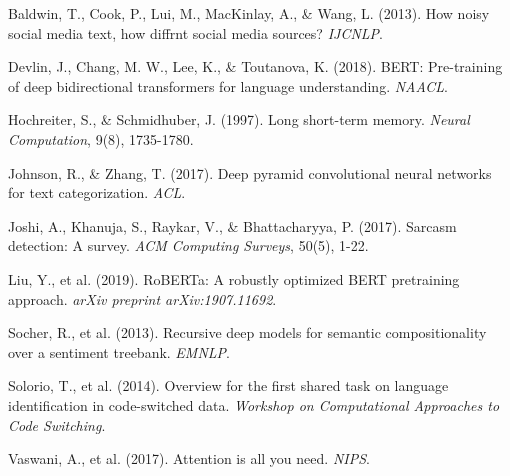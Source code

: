 \documentclass[11pt,a4paper]{article}
\begin{document}

\begin{thebibliography}{10}

Baldwin, T., Cook, P., Lui, M., MacKinlay, A., \& Wang, L. (2013). How noisy social media text, how diffrnt social media sources? \textit{IJCNLP}.

Devlin, J., Chang, M. W., Lee, K., \& Toutanova, K. (2018). BERT: Pre-training of deep bidirectional transformers for language understanding. \textit{NAACL}.

Hochreiter, S., \& Schmidhuber, J. (1997). Long short-term memory. \textit{Neural Computation}, 9(8), 1735-1780.

Johnson, R., \& Zhang, T. (2017). Deep pyramid convolutional neural networks for text categorization. \textit{ACL}.

Joshi, A., Khanuja, S., Raykar, V., \& Bhattacharyya, P. (2017). Sarcasm detection: A survey. \textit{ACM Computing Surveys}, 50(5), 1-22.

Liu, Y., et al. (2019). RoBERTa: A robustly optimized BERT pretraining approach. \textit{arXiv preprint arXiv:1907.11692}.

Socher, R., et al. (2013). Recursive deep models for semantic compositionality over a sentiment treebank. \textit{EMNLP}.

Solorio, T., et al. (2014). Overview for the first shared task on language identification in code-switched data. \textit{Workshop on Computational Approaches to Code Switching}.

Vaswani, A., et al. (2017). Attention is all you need. \textit{NIPS}.

\end{thebibliography}
\end{document}
